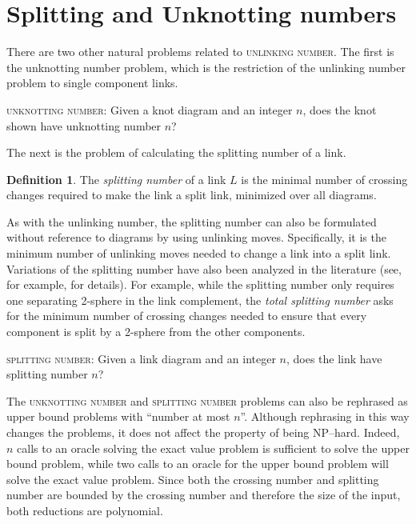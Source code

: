 \documentclass[12pt]{amsart}
\theoremstyle{definition}
\newtheorem{defn}[thm]{Definition}
\theoremstyle{remark}
\begin{document}
\section{Splitting and Unknotting numbers}
\label{sec_splittingnum}

There are two other natural problems related to \textsc{unlinking number}.
The first is the unknotting number problem, which is the restriction of the unlinking number problem to single component links.


\vspace{0.14in}
\textsc{unknotting number}: Given a knot diagram and an integer $n$, does the knot shown have unknotting number $n$?
\vspace{0.14in}



The next is the problem of calculating the splitting number of a link.
\begin{defn}
The \emph{splitting number} of a link $L$ is the minimal number of crossing changes required to make the link a split link, minimized over all diagrams.
\end{defn}
As with the unlinking number, the splitting number can also be formulated without reference to diagrams by using unlinking moves.
Specifically, it is the minimum number of unlinking moves needed to change a link into a split link.
Variations of the splitting number have also been analyzed in the literature (see, for example, \cite{Lackenby3} for details).
For example, while the splitting number only requires one separating 2-sphere in the link complement,  the \emph{total splitting number} asks for the minimum number of crossing changes needed to ensure that every component is split by a 2-sphere from the other components.

\vspace{0.14in}
\textsc{splitting number}: Given a link diagram and an integer $n$, does the link have splitting number $n$?
\vspace{0.14in}

The \textsc{unknotting number} and \textsc{splitting number} problems can also be rephrased as upper bound problems with ``number at most $n$''.
Although rephrasing in this way changes the problems, it does not affect the property of being NP--hard.
Indeed, $n$ calls to an oracle solving the exact value problem is sufficient to solve the upper bound problem, while two calls to an oracle for the upper bound problem will solve the exact value problem.
Since both the crossing number and splitting number are bounded by the crossing number and therefore the size of the input, both reductions are polynomial.
\end{document}
